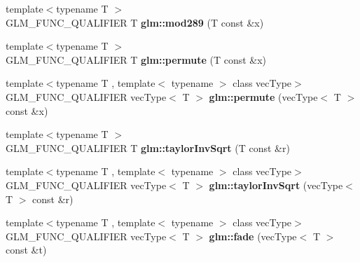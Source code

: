 \begin{DoxyCompactItemize}
\item 
\hypertarget{namespaceglm_a200b37daa4ca17e31138a434c7078548}{{\footnotesize template$<$typename T $>$ }\\G\-L\-M\-\_\-\-F\-U\-N\-C\-\_\-\-Q\-U\-A\-L\-I\-F\-I\-E\-R T {\bfseries glm\-::mod289} (T const \&x)}\label{namespaceglm_a200b37daa4ca17e31138a434c7078548}

\item 
\hypertarget{namespaceglm_a5c902737963cf157830767d21bf9d037}{{\footnotesize template$<$typename T $>$ }\\G\-L\-M\-\_\-\-F\-U\-N\-C\-\_\-\-Q\-U\-A\-L\-I\-F\-I\-E\-R T {\bfseries glm\-::permute} (T const \&x)}\label{namespaceglm_a5c902737963cf157830767d21bf9d037}

\item 
\hypertarget{namespaceglm_ae224d11727219390dbd151410b6be972}{{\footnotesize template$<$typename T , template$<$ typename $>$ class vec\-Type$>$ }\\G\-L\-M\-\_\-\-F\-U\-N\-C\-\_\-\-Q\-U\-A\-L\-I\-F\-I\-E\-R vec\-Type$<$ T $>$ {\bfseries glm\-::permute} (vec\-Type$<$ T $>$ const \&x)}\label{namespaceglm_ae224d11727219390dbd151410b6be972}

\item 
\hypertarget{namespaceglm_ab3d958b06e46c58ce0d3353b4f0a5892}{{\footnotesize template$<$typename T $>$ }\\G\-L\-M\-\_\-\-F\-U\-N\-C\-\_\-\-Q\-U\-A\-L\-I\-F\-I\-E\-R T {\bfseries glm\-::taylor\-Inv\-Sqrt} (T const \&r)}\label{namespaceglm_ab3d958b06e46c58ce0d3353b4f0a5892}

\item 
\hypertarget{namespaceglm_a6c5622a1dda3109e9735f0383cd515eb}{{\footnotesize template$<$typename T , template$<$ typename $>$ class vec\-Type$>$ }\\G\-L\-M\-\_\-\-F\-U\-N\-C\-\_\-\-Q\-U\-A\-L\-I\-F\-I\-E\-R vec\-Type$<$ T $>$ {\bfseries glm\-::taylor\-Inv\-Sqrt} (vec\-Type$<$ T $>$ const \&r)}\label{namespaceglm_a6c5622a1dda3109e9735f0383cd515eb}

\item 
\hypertarget{namespaceglm_a556a8de88e3d8300ebfc1d024a9cb85b}{{\footnotesize template$<$typename T , template$<$ typename $>$ class vec\-Type$>$ }\\G\-L\-M\-\_\-\-F\-U\-N\-C\-\_\-\-Q\-U\-A\-L\-I\-F\-I\-E\-R vec\-Type$<$ T $>$ {\bfseries glm\-::fade} (vec\-Type$<$ T $>$ const \&t)}\label{namespaceglm_a556a8de88e3d8300ebfc1d024a9cb85b}


\end{DoxyCompactItemize}
